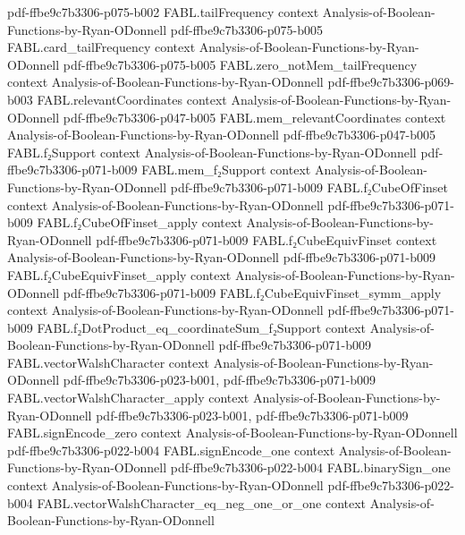 \begin{theorem}
  {pdf-ffbe9c7b3306-p075-b002}
\proofstep
  {FABL.tailFrequency}
  {context}
  {Analysis-of-Boolean-Functions-by-Ryan-ODonnell}
  {pdf-ffbe9c7b3306-p075-b005}
\proofstep
  {FABL.card_tailFrequency}
  {context}
  {Analysis-of-Boolean-Functions-by-Ryan-ODonnell}
  {pdf-ffbe9c7b3306-p075-b005}
\proofstep
  {FABL.zero_notMem_tailFrequency}
  {context}
  {Analysis-of-Boolean-Functions-by-Ryan-ODonnell}
  {pdf-ffbe9c7b3306-p069-b003}
\proofstep
  {FABL.relevantCoordinates}
  {context}
  {Analysis-of-Boolean-Functions-by-Ryan-ODonnell}
  {pdf-ffbe9c7b3306-p047-b005}
\proofstep
  {FABL.mem_relevantCoordinates}
  {context}
  {Analysis-of-Boolean-Functions-by-Ryan-ODonnell}
  {pdf-ffbe9c7b3306-p047-b005}
\proofstep
  {FABL.f₂Support}
  {context}
  {Analysis-of-Boolean-Functions-by-Ryan-ODonnell}
  {pdf-ffbe9c7b3306-p071-b009}
\proofstep
  {FABL.mem_f₂Support}
  {context}
  {Analysis-of-Boolean-Functions-by-Ryan-ODonnell}
  {pdf-ffbe9c7b3306-p071-b009}
\proofstep
  {FABL.f₂CubeOfFinset}
  {context}
  {Analysis-of-Boolean-Functions-by-Ryan-ODonnell}
  {pdf-ffbe9c7b3306-p071-b009}
\proofstep
  {FABL.f₂CubeOfFinset_apply}
  {context}
  {Analysis-of-Boolean-Functions-by-Ryan-ODonnell}
  {pdf-ffbe9c7b3306-p071-b009}
\proofstep
  {FABL.f₂CubeEquivFinset}
  {context}
  {Analysis-of-Boolean-Functions-by-Ryan-ODonnell}
  {pdf-ffbe9c7b3306-p071-b009}
\proofstep
  {FABL.f₂CubeEquivFinset_apply}
  {context}
  {Analysis-of-Boolean-Functions-by-Ryan-ODonnell}
  {pdf-ffbe9c7b3306-p071-b009}
\proofstep
  {FABL.f₂CubeEquivFinset_symm_apply}
  {context}
  {Analysis-of-Boolean-Functions-by-Ryan-ODonnell}
  {pdf-ffbe9c7b3306-p071-b009}
\proofstep
  {FABL.f₂DotProduct_eq_coordinateSum_f₂Support}
  {context}
  {Analysis-of-Boolean-Functions-by-Ryan-ODonnell}
  {pdf-ffbe9c7b3306-p071-b009}
\proofstep
  {FABL.vectorWalshCharacter}
  {context}
  {Analysis-of-Boolean-Functions-by-Ryan-ODonnell}
  {pdf-ffbe9c7b3306-p023-b001,
    pdf-ffbe9c7b3306-p071-b009}
\proofstep
  {FABL.vectorWalshCharacter_apply}
  {context}
  {Analysis-of-Boolean-Functions-by-Ryan-ODonnell}
  {pdf-ffbe9c7b3306-p023-b001,
    pdf-ffbe9c7b3306-p071-b009}
\proofstep
  {FABL.signEncode_zero}
  {context}
  {Analysis-of-Boolean-Functions-by-Ryan-ODonnell}
  {pdf-ffbe9c7b3306-p022-b004}
\proofstep
  {FABL.signEncode_one}
  {context}
  {Analysis-of-Boolean-Functions-by-Ryan-ODonnell}
  {pdf-ffbe9c7b3306-p022-b004}
\proofstep
  {FABL.binarySign_one}
  {context}
  {Analysis-of-Boolean-Functions-by-Ryan-ODonnell}
  {pdf-ffbe9c7b3306-p022-b004}
\proofstep
  {FABL.vectorWalshCharacter_eq_neg_one_or_one}
  {context}
  {Analysis-of-Boolean-Functions-by-Ryan-ODonnell}

\end{theorem}
